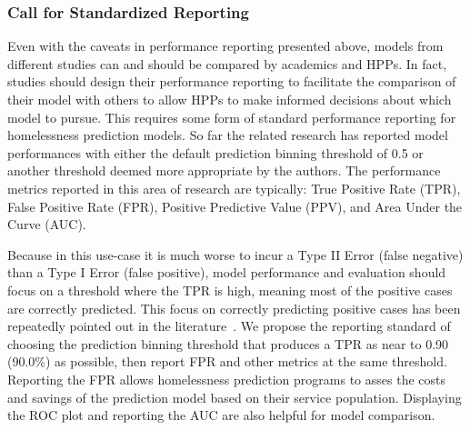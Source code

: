 \documentclass[10pt,letterpaper]{article}
\begin{document}
\subsubsection*{Call for Standardized Reporting}
Even with the caveats in performance reporting presented above, models from different studies can and should be compared by academics and HPPs. In fact, studies should design their performance reporting to facilitate the comparison of their model with others to allow HPPs to make informed decisions about which model to pursue. This requires some form of standard performance reporting for homelessness prediction models. So far the related research has reported model performances with either the default prediction binning threshold of 0.5 or another threshold deemed more appropriate by the authors. The performance metrics reported in this area of research are typically: True Positive Rate (TPR), False Positive Rate (FPR), Positive Predictive Value (PPV), and Area Under the Curve (AUC). 

Because in this use-case it is much worse to incur a Type II Error (false negative) than a Type I Error (false positive), model performance and evaluation should focus on a threshold where the TPR is high, meaning most of the positive cases are correctly predicted. This focus on correctly predicting positive cases has been repeatedly pointed out in the literature~\cite{vanberlo2021interpretable,hong2018applications}. We propose the reporting standard of choosing the prediction binning threshold that produces a TPR as near to 0.90 (90.0\%) as possible, then report FPR and other metrics at the same threshold. Reporting the FPR allows homelessness prediction programs to asses the costs and savings of the prediction model based on their service population. Displaying the ROC plot and reporting the AUC are also helpful for model comparison. 
\end{document}
